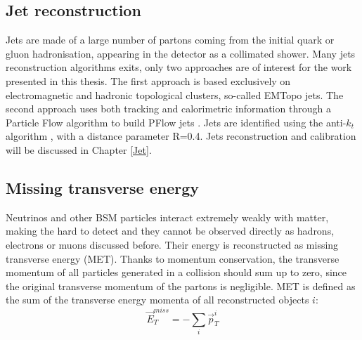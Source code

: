 \subsection{Jet reconstruction}
\label{chap2:Objects:Jet}
Jets are made of a large number of partons coming from the initial quark or gluon hadronisation, appearing in the detector as a collimated shower. Many jets reconstruction algorithms exits, only two approaches are of interest for the work presented in this thesis. The first approach is based exclusively on electromagnetic and hadronic topological clusters, so-called EMTopo jets. The second approach uses both tracking and calorimetric information through a Particle Flow algorithm to build PFlow jets \cite{Jet_Perf_Run2}. Jets are identified using the anti-$k_t$ algorithm \cite{Anti-Kt}, with a distance parameter R=0.4. Jets reconstruction and calibration will be discussed in Chapter \ref{Jet}. 

\subsection{Missing transverse energy}
\label{chap2:Objects:MET}
Neutrinos and other BSM particles interact extremely weakly with matter, making the hard to detect and they cannot be observed directly as hadrons, electrons or muons discussed before. Their energy is reconstructed as missing transverse energy (MET). Thanks to momentum conservation, the transverse momentum of all particles generated in a collision should sum up to zero, since the original transverse momentum of the partons is negligible. MET is defined as the sum of the transverse energy momenta of all reconstructed objects $i$: 
\begin{equation}
    \vec{E}_{T}^{m i s s}=-\sum_{i} \vec{p}_{T}^{i}
\end{equation}
